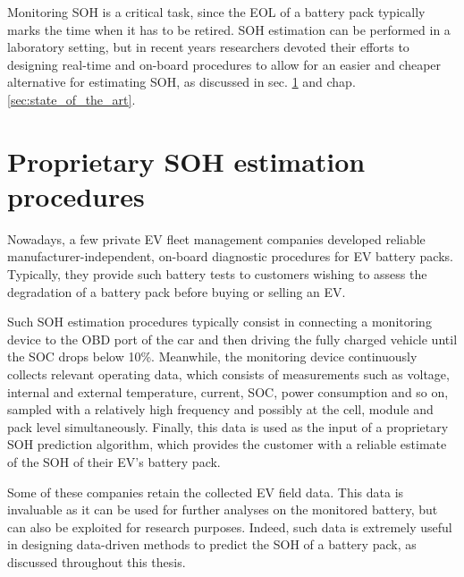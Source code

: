 Monitoring SOH is a critical task, since the EOL of a battery pack typically marks the time when it has to be retired. SOH estimation can be performed in a laboratory setting, but in recent years researchers devoted their efforts to designing real-time and on-board procedures to allow for an easier and cheaper alternative for estimating SOH, as discussed in sec. \ref{sec:aviloo} and chap. \ref{sec:state_of_the_art}.

\section{Proprietary SOH estimation procedures}
\label{sec:aviloo}
Nowadays, a few private EV fleet management companies developed reliable manufacturer-independent, on-board diagnostic procedures for EV battery packs. Typically, they provide such battery tests to customers wishing to assess the degradation of a battery pack before buying or selling an EV.

Such SOH estimation procedures typically consist in connecting a monitoring device to the OBD port of the car and then driving the fully charged vehicle until the SOC drops below 10\%. Meanwhile, the monitoring device continuously collects relevant operating data, which consists of measurements such as voltage, internal and external temperature, current, SOC, power consumption and so on, sampled with a relatively high frequency and possibly at the cell, module and pack level simultaneously. Finally, this data is used as the input of a proprietary SOH prediction algorithm, which provides the customer with a reliable estimate of the SOH of their EV's battery pack.

Some of these companies retain the collected EV field data. This data is invaluable as it can be used for further analyses on the monitored battery, but can also be exploited for research purposes. Indeed, such data is extremely useful in designing data-driven methods to predict the SOH of a battery pack, as discussed throughout this thesis.



